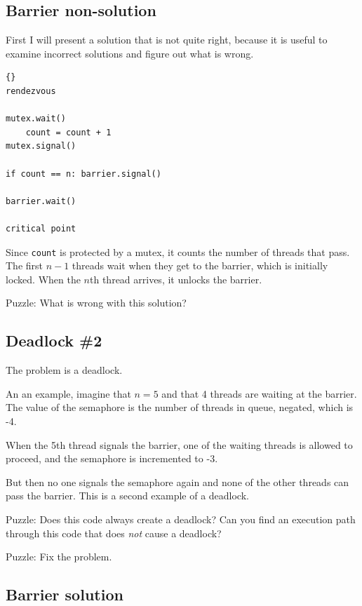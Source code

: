 \documentclass{book}
\begin{document}
\subsection {Barrier non-solution}

First I will present a solution that is not quite right, because
it is useful to examine incorrect solutions and figure out what
is wrong.

\newpage
\begin{lstlisting}[title={Barrier non-solution}]{}
rendezvous

mutex.wait()
    count = count + 1
mutex.signal()

if count == n: barrier.signal()

barrier.wait()

critical point
\end{lstlisting}

Since {\tt count} is protected by a mutex, it counts the number of
threads that pass.  The first $n-1$ threads wait when they get to the
barrier, which is initially locked.  When the $n$th thread arrives, it
unlocks the barrier.

Puzzle:  What is wrong with this solution?



\subsection{Deadlock \#2}

The problem is a deadlock.

An an example, imagine that $n=5$
and that 4 threads are waiting at the barrier.  The value
of the semaphore is the number of threads in queue, negated,
which is -4.

When the 5th thread signals the barrier, one of the waiting
threads is allowed to proceed, and the semaphore is incremented
to -3.

But then no one signals the semaphore again and none of the
other threads can pass the barrier.
This is a second example of a deadlock.

Puzzle: Does this code always create a deadlock?  Can you find an
execution path through this code that does {\em not} cause a deadlock?

Puzzle: Fix the problem.



\subsection{Barrier solution}
\label{barrier}
\end{document}
